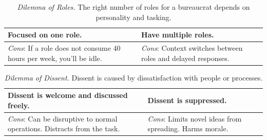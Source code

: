 

\begin{center}
\begin{table}[H] %
\begin{tabular}{ | m{\dilemmatablewidth}| m{\dilemmatablewidth} | } 
  \hline
  \textbf{Focused on one role.} & 
  \textbf{Have multiple roles.} \\ 
  \hline
  \textit{Cons}: If a role does not consume 40 hours per week, you'll be idle. & 
  \textit{Cons}: Context switches between roles and delayed responses. \\  
  \hline
\end{tabular}
\caption{
\textit{Dilemma of Roles.}
The right number of roles for a bureaucrat depends on personality and tasking. 
}
\label{table:dilemma-number-of-roles}
\end{table}
\end{center}



\begin{center}
\begin{table}[H] %
\begin{tabular}{ | m{\dilemmatablewidth}| m{\dilemmatablewidth} | } 
  \hline
  \textbf{Dissent is welcome and discussed freely.} & 
  \textbf{Dissent is suppressed.} \\ 
  \hline
  \textit{Cons}: Can be disruptive to normal operations. Distracts from the task. & 
  \textit{Cons}: Limits novel ideas from spreading. Harms morale. \\  
  \hline
\end{tabular}
\caption{
\textit{Dilemma of Dissent.}
Dissent is caused by dissatisfaction with people or processes. 
}
\label{table:dilemma-how-dissent-is-responded-to}
\end{table}
\end{center}

